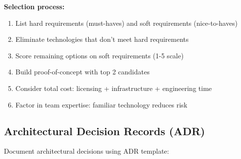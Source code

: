 \textbf{Selection process:}
\begin{enumerate}
    \item List hard requirements (must-haves) and soft requirements (nice-to-haves)
    \item Eliminate technologies that don't meet hard requirements
    \item Score remaining options on soft requirements (1-5 scale)
    \item Build proof-of-concept with top 2 candidates
    \item Consider total cost: licensing + infrastructure + engineering time
    \item Factor in team expertise: familiar technology reduces risk
\end{enumerate}

\subsection{Architectural Decision Records (ADR)}

Document architectural decisions using ADR template:

